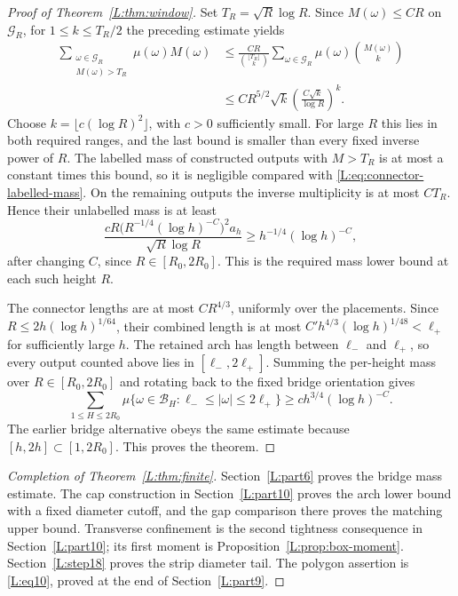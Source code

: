 \begin{proof}[Proof of Theorem~\ref{L:thm:window}]
Set $T_R=\sqrt R\log R$. Since $M(\omega)\le CR$ on
$\mathcal G_R$, for $1\le k\le T_R/2$ the preceding estimate yields
\[
 \begin{aligned}
 \sum_{\substack{\omega\in\mathcal G_R\\M(\omega)>T_R}}
       \mu(\omega)M(\omega)
 &\le \frac{CR}{\binom{\lfloor T_R\rfloor}{k}}
       \sum_{\omega\in\mathcal G_R}\mu(\omega)
       \binom{M(\omega)}{k}\\
 &\le CR^{5/2}\sqrt k
       \left(\frac{C\sqrt k}{\log R}\right)^k.
 \end{aligned}
\]
Choose $k=\lfloor c(\log R)^2\rfloor$, with $c>0$ sufficiently
small. For large $R$ this lies in both required ranges, and the last
bound is smaller than every fixed inverse power of $R$. The labelled
mass of constructed outputs with $M>T_R$ is at most a constant times
this bound, so it is negligible compared with
\eqref{L:eq:connector-labelled-mass}. On the remaining outputs the
inverse multiplicity is at most $CT_R$. Hence their unlabelled mass
is at least
\[
 \frac{cR\bigl(R^{-1/4}(\log h)^{-C}\bigr)^2a_h}
      {\sqrt R\log R}
 \ge h^{-1/4}(\log h)^{-C},
\]
after changing $C$, since $R\in[R_0,2R_0]$. This is the required
mass lower bound at each such height $R$.

The connector lengths are at most $CR^{4/3}$, uniformly over the
placements.  Since $R\le2h(\log h)^{1/64}$, their combined length is
at most $C'h^{4/3}(\log h)^{1/48}<\ell_+$ for sufficiently large $h$.
The retained arch has length between $\ell_-$ and $\ell_+$, so every
output counted above lies in $[\ell_-,2\ell_+]$.  Summing the per-height
mass over $R\in[R_0,2R_0]$ and rotating back to the fixed bridge
orientation gives
\begin{equation}
 \sum_{1\le H\le2R_0}
 \mu\{\omega\in\mathcal B_H:\ell_-\le|\omega|\le2\ell_+\}
 \ge c h^{3/4}(\log h)^{-C}.
 \label{L:eq11}
\end{equation}
The earlier bridge alternative obeys the same estimate because
$[h,2h]\subset[1,2R_0]$.  This proves the theorem.
\end{proof}

\begin{proof}[Completion of Theorem~\ref{L:thm:finite}]
Section~\ref{L:part6} proves the bridge mass estimate. The cap construction
in Section~\ref{L:part10} proves the arch lower bound with a fixed diameter
cutoff, and the gap comparison there proves the matching upper bound. Transverse confinement is the second tightness
consequence in Section~\ref{L:part10}; its first moment is
Proposition~\ref{L:prop:box-moment}. Section~\ref{L:step18} proves the
strip diameter tail. The polygon assertion is \eqref{L:eq10}, proved at
the end of Section~\ref{L:part9}.
\end{proof}

